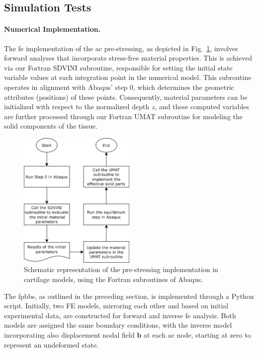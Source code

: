\documentclass[12pt,a4paper]{report}
\begin{document}
\subsection{Simulation Tests}\label{section:simulation_fe}

\paragraph{Numerical Implementation.} The \ac{fe} implementation of the \ac{ac} pre-stressing, as depicted in Fig.~\ref{fig:psa_subroutines}, involves forward analyses that incorporate stress-free material properties. This is achieved via our Fortran SDVINI subroutine, responsible for setting the initial state variable values at each integration point in the numerical model. This subroutine operates in alignment with Abaqus' step 0, which determines the geometric attributes (positions) of these points. Consequently, material parameters can be initialized with respect to the normalized depth $z$, and these computed variables are further processed through our Fortran UMAT subroutine for modeling the solid components of the tissue.

\begin{figure}[t]\centering
\includegraphics[width=0.5\textwidth]{img/psa_subroutines.png}
\caption{Schematic representation of the pre-stressing implementation in cartilage models, using the Fortran subroutines of Abaqus.}
\label{fig:psa_subroutines}
\end{figure}

The \ac{fpbbs}, as outlined in the preceding section, is implemented through a Python script. Initially, two FE models, mirroring each other and based on initial experimental data, are constructed for forward and inverse \ac{fe} analysis. Both models are assigned the same boundary conditions, with the inverse model incorporating also displacement nodal field $\mathbf{b}$ at each \ac{ac} node, starting at zero to represent an undeformed state.
\end{document}

